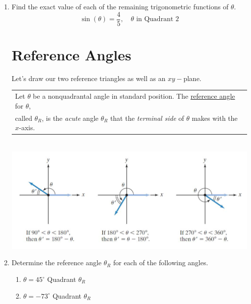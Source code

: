 \documentclass[11pt]{article}
\begin{document}
\begin{enumerate}
\item Find the exact value of each of the remaining trigonometric functions of $\theta$.
$$\sin(\theta)=\frac{4}{5}, \quad  \theta \text{ in Quadrant 2}$$\vfill


\section{Reference Angles}

Let's draw our two reference triangles as well as an $xy-$plane.\\[1.5in]
\hspace{-.3in}\begin{tabular}{| l |} \hline
Let $\theta$ be a nonquadrantal angle in standard position. The \underline{reference angle} for $\theta$, \\ called $\theta_R$, is the \emph{acute} angle $\theta_R$ that the \emph{terminal side} of $\theta$ makes with the $x$-axis. \\ \hline
\end{tabular}\\
\includegraphics{refimage}\\

\newpage

\item Determine the reference angle $\theta_R$ for each of the following angles.
\begin{enumerate}
\item $\theta = 45^\circ$ \hspace{1in} Quadrant \underline{\phantom{sldkjfslkdjf}} \hspace{1in} $\theta_R$ \underline{\phantom{sldkjfslkdjf}} \\[.8in]
\item $\theta = -73^\circ$ \hspace{1in} Quadrant \underline{\phantom{sldkjfslkdjf}} \hspace{1in} $\theta_R$ \underline{\phantom{sldkjfslkdjf}}  \\[.8in]


\end{enumerate}
\end{enumerate}
\end{document}
